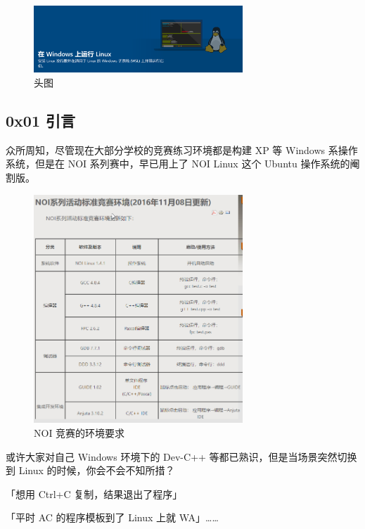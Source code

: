
\begin{figure}[htbp]
\centering
\includegraphics[width=0.7\textwidth]{docs/intro/images/WSL1.png} 
\caption{头图}
\end{figure}

\hr

\subsection{0x01 引言}

众所周知，尽管现在大部分学校的竞赛练习环境都是构建 XP 等 Windows 系操作系统，但是在 NOI 系列赛中，早已用上了 NOI Linux 这个 Ubuntu 操作系统的阉割版。  

\begin{figure}[htbp]
\centering
\includegraphics[width=0.7\textwidth]{docs/intro/images/WSL2.png} 
\caption{NOI 竞赛的环境要求}
\end{figure}           



或许大家对自己 Windows 环境下的 Dev-C++ 等都已熟识，但是当场景突然切换到 Linux 的时候，你会不会不知所措？

\begin{QUOTE}{}{}
「想用 Ctrl+C 复制，结果退出了程序」  



「平时 AC 的程序模板到了 Linux 上就 WA」……
\end{QUOTE}

